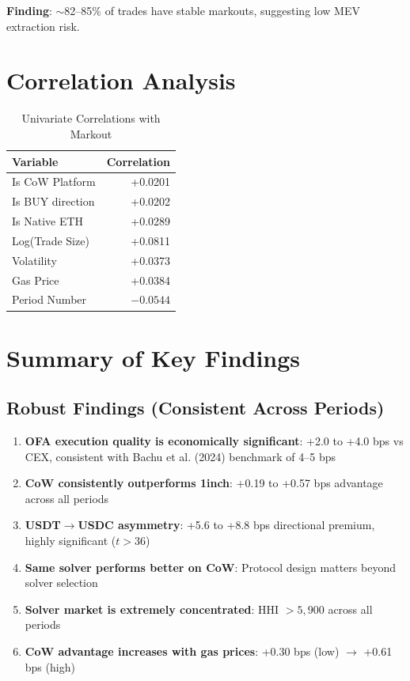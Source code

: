 \documentclass[11pt,a4paper]{article}
\begin{document}
\textbf{Finding}: $\sim$82--85\% of trades have stable markouts, suggesting low MEV extraction risk.

\section{Correlation Analysis}

\begin{table}[H]
\centering
\caption{Univariate Correlations with Markout}
\begin{tabular}{lr}
\toprule
\textbf{Variable} & \textbf{Correlation} \\
\midrule
Is CoW Platform & +0.0201 \\
Is BUY direction & +0.0202 \\
Is Native ETH & +0.0289 \\
Log(Trade Size) & +0.0811 \\
Volatility & +0.0373 \\
Gas Price & +0.0384 \\
Period Number & $-0.0544$ \\
\bottomrule
\end{tabular}
\end{table}

\section{Summary of Key Findings}

\subsection{Robust Findings (Consistent Across Periods)}

\begin{enumerate}
    \item \textbf{OFA execution quality is economically significant}: +2.0 to +4.0 bps vs CEX, consistent with Bachu et al. (2024) benchmark of 4--5 bps

    \item \textbf{CoW consistently outperforms 1inch}: +0.19 to +0.57 bps advantage across all periods

    \item \textbf{USDT$\rightarrow$USDC asymmetry}: +5.6 to +8.8 bps directional premium, highly significant ($t > 36$)

    \item \textbf{Same solver performs better on CoW}: Protocol design matters beyond solver selection

    \item \textbf{Solver market is extremely concentrated}: HHI $> 5,900$ across all periods

    \item \textbf{CoW advantage increases with gas prices}: +0.30 bps (low) $\rightarrow$ +0.61 bps (high)
\end{enumerate}
\end{document}
